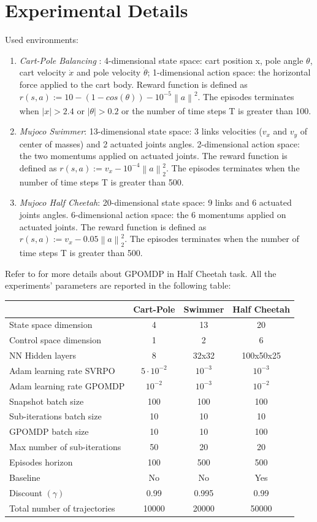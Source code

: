 \documentclass{article}
\theoremstyle{remark}
\theoremstyle{definition}
\newcommand{\norm}[2][\infty]{\left\|#2\right\|_{#1}}
\begin{document}
\section{Experimental Details}\label{app:exp}
Used environments:
\begin{enumerate}
	\item \emph{Cart-Pole Balancing} : 4-dimensional state space: cart position x, pole angle $\theta$, cart velocity $\dot{x}$ and pole velocity $\dot{\theta}$; 1-dimensional action space: the horizontal force applied to the cart body. Reward function  is defined as $r(s, a) := 10 - (1 - cos(\theta)) - 10^{-5}\norm[] a^2$. The episodes terminates when $|x|>2.4$ or $|\theta|>0.2$ or the number of time steps T is greater than 100.
	\item \emph{Mujoco Swimmer}: 13-dimensional state space: 3 links velocities ($v_x$ and $v_y$ of center of masses) and 2 actuated joints angles. 2-dimensional action space: the two momentums applied on actuated joints.  The reward function is defined as $r(s, a) := v_x - 10^{-4}\norm[2] a^2$. The episodes terminates when the number of time steps T is greater than 500.
	\item \emph{Mujoco Half Cheetah}: 20-dimensional state space: 9 links and 6 actuated joints angles. 6-dimensional action space: the 6 momentums applied on actuated joints.  The reward function is defined as $r(s, a) := v_x - 0.05\norm[2] a^2$. The episodes terminates when the number of time steps T is greater than 500.
\end{enumerate}

Refer to \cite{duan2016benchmarking}  for more details about GPOMDP in Half Cheetah task.
All the experiments' parameters are reported in the following table:

\centering
\begin{tabular}{| l | c  c  c |}
	\hline	
	& Cart-Pole & Swimmer & Half Cheetah \\
	\hline
	State space dimension  & 4 & 13 & 20 \\
	Control space dimension & 1 & 2 & 6 \\
	NN Hidden layers & 8 & 32x32 & 100x50x25 \\
	Adam learning rate SVRPO & $5\cdotp10^{-2}$ & $10^{-3}$ & $10^{-3}$ \\
	Adam learning rate GPOMDP & $10^{-2}$ & $10^{-3}$ & $10^{-2}$ \\
	Snapshot batch size & 100 & 100 & 100 \\
	Sub-iterations batch size & 10 & 10 & 10 \\
	GPOMDP batch size & 10 & 10 & 100 \\
	Max number of sub-iterations & 50 & 20 & 20 \\
	Episodes horizon& 100 & 500 & 500 \\
	Baseline& No & No & Yes \\
	Discount $(\gamma)$& 0.99 & 0.995 & 0.99 \\
	Total number of trajectories& 10000 & 20000 & 50000 \\
	\hline  
\end{tabular}
\end{document}
